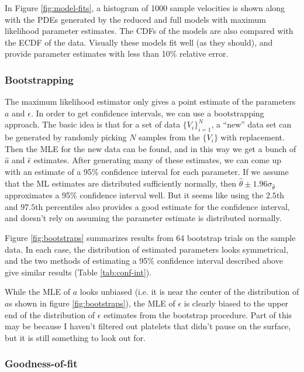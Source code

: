 In Figure \ref{fig:model-fits}, a histogram of 1000 sample velocities
is shown along with the PDEs generated by the reduced and full models
with maximum likelihood parameter estimates. The CDFs of the models
are also compared with the ECDF of the data. Visually these models fit
well (as they should), and provide parameter estimates with less than
10\% relative error.

\subsubsection{Bootstrapping}
\label{sec:bootstrapping}

The maximum likelihood estimator only gives a point estimate of the
parameters $a$ and $\epsilon$. In order to get confidence intervals,
we can use a bootstrapping approach. The basic idea is that for a set
of data $\{V_i\}_{i=1}^N$, a ``new'' data set can be generated by
randomly picking $N$ samples from the $\{V_i\}$ with replacement. Then
the MLE for the new data can be found, and in this way we get a bunch
of $\hat{a}$ and $\hat{\epsilon}$ estimates. After generating many of
these estimates, we can come up with an estimate of a 95\% confidence
interval for each parameter. If we assume that the ML estimates are
distributed sufficiently normally, then
$\hat{\theta} \pm 1.96 \sigma_{\hat{\theta}}$ approximates a 95\%
confidence interval well. But it seems like using the $2.5$th and
$97.5$th percentiles also provides a good estimate for the confidence
interval, and doesn't rely on assuming the parameter estimate is
distributed normally.

Figure \ref{fig:bootstraps} summarizes results from 64 bootstrap
trials on the sample data. In each case, the distribution of estimated
parameters looks symmetrical, and the two methods of estimating a 95\%
confidence interval described above give similar results (Table
\ref{tab:conf-int}).

While the MLE of $a$ looks unbiased (i.e. it is near the center of the
distribution of $a$s shown in figure \ref{fig:bootstraps}), the MLE of
$\epsilon$ is clearly biased to the upper end of the distribution of
$\epsilon$ estimates from the bootstrap procedure. Part of this may be
because I haven't filtered out platelets that didn't pause on the
surface, but it is still something to look out for. 

\subsubsection{Goodness-of-fit}
\label{sec:goodness-fit}

